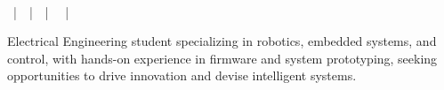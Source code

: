 
\newcommand{\job}[4]{%
  \vspace{4pt}%
  \noindent
  \begin{tabularx}{\linewidth}{@{}X r@{}}
    \textbf{#1} & \small #2 \\[-2pt]
    \textit{#3} & \small #4 \\
  \end{tabularx}%
  \vspace{-1pt}%
}

\newcommand{\edu}[4]{%
  \noindent
  \begin{tabularx}{\linewidth}{@{}X r@{}}
    \textbf{#1} & \small #2 \\[-2pt]
    \textit{#3} & \small #4 \\
  \end{tabularx}%
}

\newcommand{\activities}[1]{%
  \vspace{2pt}%
  \noindent\textit{\underline{Activities and Societies:}} #1\par%
}

\newcommand{\skill}[2]{%
  \noindent\textit{\underline{#1:}} #2\par\vspace{2pt}%
}


\pagestyle{empty}

\begin{center}
  {\fontsize{16}{19}\selectfont\itshape \myName}\\[3pt]
  \myCity~|~\href{mailto:\myEmail}{\myEmail}~|~\myPhone~|~%
  \href{https://\myLinkedIn}{\myLinkedIn}~|~%
  \href{https://\myGithub}{\myGithub}
\end{center}
\vspace{2pt}
\noindent Electrical Engineering student specializing in robotics, embedded systems, and control, with hands-on experience in firmware and system prototyping, seeking opportunities to drive innovation and devise intelligent systems.

